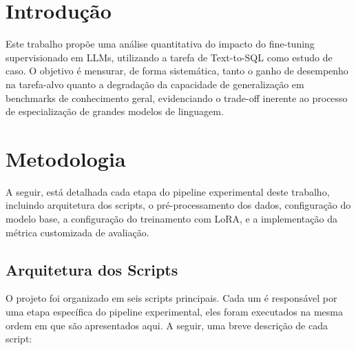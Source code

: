 \documentclass[journal,onecolumn]{IEEEtran}
\begin{document}
\section{Introdução}
Este trabalho propõe uma análise quantitativa do impacto do fine-tuning supervisionado em LLMs, utilizando a tarefa de Text-to-SQL como estudo de caso. O objetivo é mensurar, de forma sistemática, tanto o ganho de desempenho na tarefa-alvo quanto a degradação da capacidade de generalização em benchmarks de conhecimento geral, evidenciando o trade-off inerente ao processo de especialização de grandes modelos de linguagem.

\section{Metodologia}
 A seguir, está detalhada cada etapa do pipeline experimental deste trabalho, incluindo arquitetura dos scripts, o pré-processamento dos dados, configuração do modelo base, a configuração do treinamento com LoRA, e a implementação da métrica customizada de avaliação.

\subsection{Arquitetura dos Scripts}

O projeto foi organizado em seis scripts principais. Cada um é responsável por uma etapa específica do pipeline experimental, eles foram executados na mesma ordem em que são apresentados aqui. A seguir, uma breve descrição de cada script:
\end{document}
